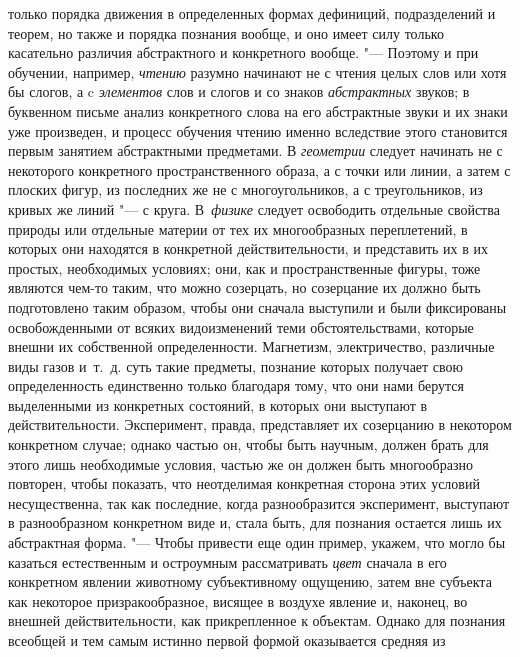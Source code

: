 только порядка движения в определенных формах дефиниций, подразделений и
теорем, но также и порядка познания вообще, и оно имеет силу только
касательно различия абстрактного и конкретного
вообще.
"--- Поэтому и при обучении, например,
{\em чтению} разумно
начинают не с чтения целых слов или хотя бы слогов, а c
{\em элементов} слов и
слогов и со знаков {\em абстрактных}
звуков; в буквенном письме анализ конкретного слова на его
абстрактные звуки и их знаки уже произведен, и процесс обучения чтению
именно вследствие этого становится первым занятием абстрактными предметами.
В {\em геометрии} следует
начинать не с некоторого конкретного пространственного образа, а с точки
или линии, а затем с плоских фигур, из последних же не с многоугольников, а
с треугольников, из кривых же линий "--- с круга. В~{\em физике} следует
освободить отдельные свойства природы или отдельные материи от тех их
многообразных переплетений, в которых они находятся в конкретной
действительности, и представить их в их простых, необходимых условиях; они,
как и пространственные фигуры, тоже являются чем-то таким, что можно
созерцать, но созерцание их должно быть подготовлено таким образом, чтобы
они сначала выступили и были фиксированы освобожденными от всяких
видоизменений теми обстоятельствами, которые внешни их
собственной определенности. Магнетизм, электричество, различные виды газов
и~т.~д. суть такие предметы, познание которых получает свою определенность
единственно только благодаря тому, что они нами берутся выделенными из
конкретных состояний, в которых они выступают в действительности.
Эксперимент, правда, представляет их созерцанию в некотором конкретном
случае; однако частью он, чтобы быть научным, должен брать для этого лишь
необходимые условия, частью же он должен быть многообразно повторен, чтобы
показать, что неотделимая конкретная сторона этих условий несущественна,
так как последние, когда разнообразится эксперимент, выступают в
разнообразном конкретном виде и, стала быть, для познания остается лишь их
абстрактная форма. "--- Чтобы привести еще один пример, укажем,
что могло бы казаться естественным и остроумным рассматривать
{\em цвет} сначала в его
конкретном явлении животному субъективному ощущению, затем вне субъекта как
некоторое призракообразное, висящее в воздухе явление и, наконец, во
внешней действительности, как прикрепленное к объектам. Однако для познания
всеобщей и тем самым истинно первой формой оказывается средняя из
